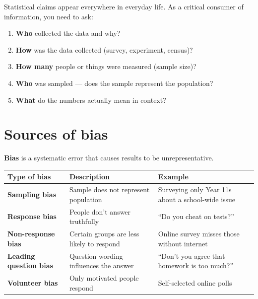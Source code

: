 \documentclass[
  11pt,
  a4paper,
  oneside,
  open=any]{scrbook}
\providecommand{\tightlist}{%
  \setlength{\itemsep}{0pt}\setlength{\parskip}{0pt}}
\begin{document}
Statistical claims appear everywhere in everyday life. As a critical
consumer of information, you need to ask:

\begin{enumerate}
\def\labelenumi{\arabic{enumi}.}
\tightlist
\item
  \textbf{Who} collected the data and why?
\item
  \textbf{How} was the data collected (survey, experiment, census)?
\item
  \textbf{How many} people or things were measured (sample size)?
\item
  \textbf{Who} was sampled --- does the sample represent the population?
\item
  \textbf{What} do the numbers actually mean in context?
\end{enumerate}

\section{Sources of bias}\label{sources-of-bias}

\textbf{Bias} is a systematic error that causes results to be
unrepresentative.

\begin{longtable}[]{@{}
  >{\raggedright\arraybackslash}p{}
  >{\raggedright\arraybackslash}p{}
  >{\raggedright\arraybackslash}p{}@{}}
\toprule\noalign{}
\begin{minipage}[b]{\linewidth}\raggedright
Type of bias
\end{minipage} & \begin{minipage}[b]{\linewidth}\raggedright
Description
\end{minipage} & \begin{minipage}[b]{\linewidth}\raggedright
Example
\end{minipage} \\
\midrule\noalign{}
\endhead
\bottomrule\noalign{}
\endlastfoot
\textbf{Sampling bias} & Sample does not represent population &
Surveying only Year 11s about a school-wide issue \\
\textbf{Response bias} & People don't answer truthfully & ``Do you cheat
on tests?'' \\
\textbf{Non-response bias} & Certain groups are less likely to respond &
Online survey misses those without internet \\
\textbf{Leading question bias} & Question wording influences the answer
& ``Don't you agree that homework is too much?'' \\
\textbf{Volunteer bias} & Only motivated people respond & Self-selected
online polls \\
\end{longtable}
\end{document}
